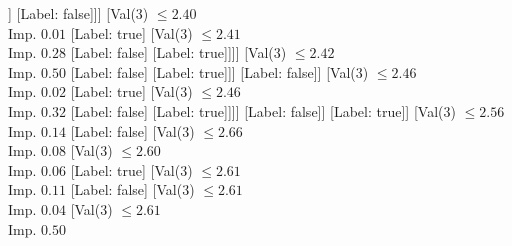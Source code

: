 \documentclass[margin=10pt]{standalone}
\begin{document}
\begin{forest}
													[Val($3$) $ \leq 2.55$ \\ Imp. $0.02$
														[Val($3$) $ \leq 2.48$ \\ Imp. $0.03$
															[Val($3$) $ \leq 2.47$ \\ Imp. $0.08$
																[Val($3$) $ \leq 2.43$ \\ Imp. $0.02$
																	[Val($3$) $ \leq 2.42$ \\ Imp. $0.14$
																		[Val($3$) $ \leq 2.42$ \\ Imp. $0.02$
																			[Val($3$) $ \leq 2.39$ \\ Imp. $0.02$
																				[Val($3$) $ \leq 2.39$ \\ Imp. $0.22$
																					[Label: true]
																					[Val($3$) $ \leq 2.39$ \\ Imp. $0.11$
																						[Val($3$) $ \leq 2.39$ \\ Imp. $0.50$
																							[Label: false]
																							[Label: true]]
																						[Label: false]]]
																				[Val($3$) $ \leq 2.40$ \\ Imp. $0.01$
																					[Label: true]
																					[Val($3$) $ \leq 2.41$ \\ Imp. $0.28$
																						[Label: false]
																						[Label: true]]]]
																			[Val($3$) $ \leq 2.42$ \\ Imp. $0.50$
																				[Label: false]
																				[Label: true]]]
																		[Label: false]]
																	[Val($3$) $ \leq 2.46$ \\ Imp. $0.02$
																		[Label: true]
																		[Val($3$) $ \leq 2.46$ \\ Imp. $0.32$
																			[Label: false]
																			[Label: true]]]]
																[Label: false]]
															[Label: true]]
														[Val($3$) $ \leq 2.56$ \\ Imp. $0.14$
															[Label: false]
															[Val($3$) $ \leq 2.66$ \\ Imp. $0.08$
																[Val($3$) $ \leq 2.60$ \\ Imp. $0.06$
																	[Label: true]
																	[Val($3$) $ \leq 2.61$ \\ Imp. $0.11$
																		[Label: false]
																		[Val($3$) $ \leq 2.61$ \\ Imp. $0.04$
																			[Val($3$) $ \leq 2.61$ \\ Imp. $0.50$

\end{forest}
\end{document}
